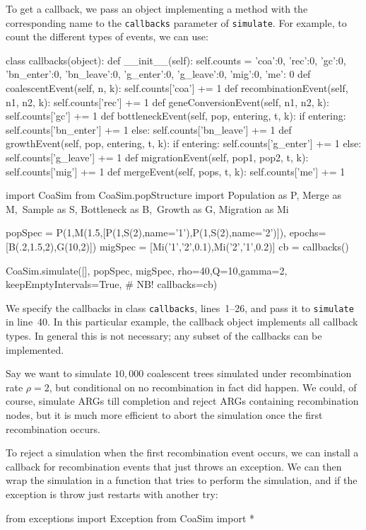\documentclass{manual}
\begin{document}
\begin{empfile}
To get a callback, we pass an object implementing a method with the
corresponding name to the \texttt{callbacks} parameter of
\texttt{simulate}.  For example, to count the different types of
events, we can use:
\begin{ncode}
class callbacks(object):
    def __init__(self):
        self.counts = {'coa':0, 'rec':0, 'gc':0,
                       'bn_enter':0, 'bn_leave':0,
                       'g_enter':0, 'g_leave':0,
                       'mig':0, 'me': 0}
    def coalescentEvent(self, n, k):
        self.counts['coa'] += 1
    def recombinationEvent(self, n1, n2, k):
        self.counts['rec'] += 1
    def geneConversionEvent(self, n1, n2, k):
        self.counts['gc'] += 1
    def bottleneckEvent(self, pop, entering, t, k):
        if entering:
            self.counts['bn_enter'] += 1
        else:
            self.counts['bn_leave'] += 1
    def growthEvent(self, pop, entering, t, k):
        if entering:
            self.counts['g_enter'] += 1
        else:
            self.counts['g_leave'] += 1
    def migrationEvent(self, pop1, pop2, t, k):
        self.counts['mig'] += 1
    def mergeEvent(self, pops, t, k):
        self.counts['me'] += 1

import CoaSim
from CoaSim.popStructure import Population as P, Merge as M,\
                                Sample as S, Bottleneck as B,\
                                Growth as G, Migration as Mi

popSpec = P(1,M(1.5,[P(1,S(2),name='1'),P(1,S(2),name='2')]),
            epochs=[B(.2,1.5,2),G(10,2)])
migSpec = [Mi('1','2',0.1),Mi('2','1',0.2)]
cb = callbacks()

CoaSim.simulate([], popSpec, migSpec, rho=40,Q=10,gamma=2,
                keepEmptyIntervals=True, # NB!
                callbacks=cb)
\end{ncode}
We specify the callbacks in class \texttt{callbacks}, lines~1--26, and
pass it to \texttt{simulate} in line~40.  In this particular example,
the callback object implements all callback types.  In general this is
not necessary; any subset of the callbacks can be implemented.

Say we want to simulate $10,000$ coalescent trees simulated under
recombination rate $\rho=2$, but conditional on no recombination in
fact did happen.  We could, of course, simulate ARGs till completion
and reject ARGs containing recombination nodes, but it is much more
efficient to abort the simulation once the first recombination occurs.

To reject a simulation when the first recombination event occurs, we
can install a callback for recombination events that just throws an
exception.  We can then wrap the simulation in a function that tries
to perform the simulation, and if the exception is throw just restarts
with another try:
\begin{ncode}
from exceptions import Exception
from CoaSim import *


\end{ncode}
\end{empfile}
\end{document}
